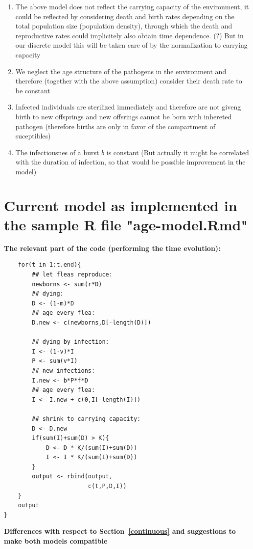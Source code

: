 \documentclass[10pt]{article}         %
\begin{document}
\begin{enumerate}
\item The above model does not reflect the carrying capacity of the environment, it could be reflected by considering death and birth rates depending on the total population size (population density), through which the death and reproductive rates could implicitely also obtain time dependence. (?) But in our discrete model this will be taken care of by the normalization to carrying capacity
\item We neglect the age structure of the pathogens in the environment and therefore (together with the above assumption) consider their death rate to be constant
\item Infected individuals are sterilized immediately and therefore are not giveng birth to new offsprings and new offsrings cannot be born with inhereted pathogen (therefore births are only in favor of the compartment of suceptibles)
\item The infectiousnes of a burst $b$ is constant (But actually it might be correlated with the duration of infection, so that would be possible improvement in the model)
\end{enumerate}
\newpage
\section{Current model as implemented in the sample R file "age-model.Rmd"}
\label{rcode}
\textbf{The relevant part of the code (performing the time evolution):}
\begin{lstlisting}
    for(t in 1:t.end){
        ## let fleas reproduce:
        newborns <- sum(r*D)
        ## dying:
        D <- (1-m)*D
        ## age every flea:
        D.new <- c(newborns,D[-length(D)])

        ## dying by infection:
        I <- (1-v)*I
        P <- sum(v*I)
        ## new infections:
        I.new <- b*P*f*D
        ## age every flea:
        I <- I.new + c(0,I[-length(I)])
        
        ## shrink to carrying capacity:
        D <- D.new
        if(sum(I)+sum(D) > K){
            D <- D * K/(sum(I)+sum(D))
            I <- I * K/(sum(I)+sum(D))
        }
        output <- rbind(output,
                        c(t,P,D,I))
    }
    output
}

\end{lstlisting}
\newpage
\textbf{Differences with respect to Section~\ref{continuous} and suggestions to make both models compatible}
\end{document}
